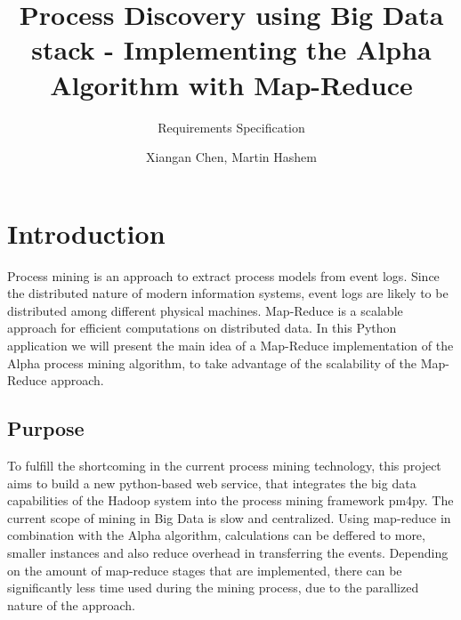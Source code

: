 \documentclass[runningheads]{llncs}
\begin{document}
%
\title{Process Discovery using Big Data stack - Implementing the Alpha Algorithm with Map-Reduce}
\subtitle{Requirements Specification}
%
%

\author{Xiangan Chen, Martin Hashem}

%
\maketitle              %
%
%
%	
%
\section{Introduction}
Process mining is an approach to extract process models from event logs. Since the distributed nature of modern information systems, event logs are likely to be distributed among different physical machines. Map-Reduce is a scalable approach for efficient computations on distributed data. In this Python application we will present the main idea of a Map-Reduce implementation of the Alpha process mining algorithm, to take advantage of the scalability of the Map-Reduce approach.\\

\subsection{Purpose}
To fulfill the shortcoming in the current process mining technology, this project aims to build a new python-based web service, that integrates the big data capabilities of the Hadoop system into the process mining framework pm4py. The current scope of mining in Big Data is slow and centralized. Using map-reduce in combination with the Alpha algorithm, calculations can be deffered to more, smaller instances and also reduce overhead in transferring the events. Depending on the amount of  map-reduce stages that are implemented, there can be significantly less time used during the mining process, due to the parallized nature of the approach. \cite{mapReduce}\\
\end{document}
